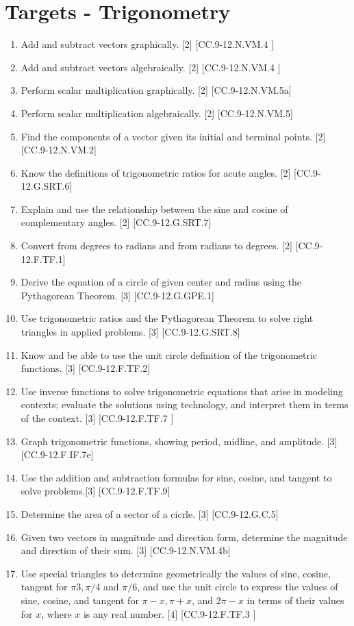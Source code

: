 \documentclass{article}
\begin{document}
\section*{Targets - Trigonometry}
\begin{enumerate}
	\item Add and subtract vectors graphically. [2] [CC.9-12.N.VM.4 ]
	\item Add and subtract vectors algebraically. [2] [CC.9-12.N.VM.4 ]
	\item Perform scalar multiplication graphically.  [2] [CC.9-12.N.VM.5a]
	\item Perform scalar multiplication algebraically.  [2] [CC.9-12.N.VM.5]
	\item Find the components of a vector given its initial and terminal points. [2] [CC.9-12.N.VM.2]
	\item Know the definitions of trigonometric ratios for acute angles. [2] [CC.9-12.G.SRT.6]
	\item Explain and use the relationship between the sine and cosine of complementary angles. [2] [CC.9-12.G.SRT.7]
	\item Convert from degrees to radians and from radians to degrees. [2] [CC.9-12.F.TF.1]
	\item Derive the equation of a circle of given center and radius using the Pythagorean Theorem. [3] [CC.9-12.G.GPE.1]
	\item Use trigonometric ratios and the Pythagorean Theorem to solve right triangles in applied problems. [3] [CC.9-12.G.SRT.8]
	\item Know and be able to use the unit circle definition of the trigonometric functions. [3] [CC.9-12.F.TF.2]
	\item Use inverse functions to solve trigonometric equations that arise in modeling contexts; evaluate the solutions using technology, and interpret them in terms of the context. [3] [CC.9-12.F.TF.7 ]
	\item Graph trigonometric functions, showing period, midline, and amplitude. [3] [CC.9-12.F.IF.7e]
	\item Use the addition and subtraction formulas for sine, cosine, and tangent to solve problems.[3] [CC.9-12.F.TF.9]
	\item Determine the area of a sector of a cicrle. [3] [CC.9-12.G.C.5]
	\item Given two vectors in magnitude and direction form, determine the magnitude and direction of their sum. [3] [CC.9-12.N.VM.4b]
	\item Use special triangles to determine geometrically the values of sine, cosine, tangent for $\pi3, \pi/4$ and $\pi/6$, and use the unit circle to express the values of sine, cosine, and tangent for $\pi - x, \pi + x$, and $2\pi - x$ in terms of their values for $x$, where $x$ is any real number. [4] [CC.9-12.F.TF.3 ]

\end{enumerate}
\end{document}
